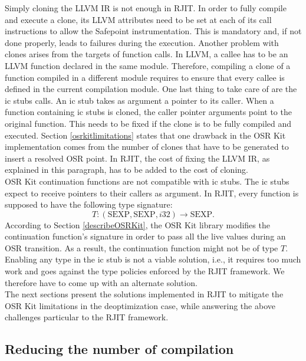 Simply cloning the LLVM IR is not enough in RJIT.
In order to fully compile and execute a clone, its LLVM attributes need to be set at each of its call instructions to allow the Safepoint instrumentation.
This is mandatory and, if not done properly, leads to failures during the execution.
Another problem with clones arises from the targets of function calls.
In LLVM, a callee has to be an LLVM function declared in the same module.
Therefore, compiling a clone of a function compiled in a different module requires to ensure that every callee is defined in the current compilation module.
One last thing to take care of are the ic stubs calls.
An ic stub takes as argument a pointer to its caller.
When a function containing ic stubs is cloned, the caller pointer arguments point to the original function.
This needs to be fixed if the clone is to be fully compiled and executed.
Section \ref{osrkitlimitations} states that one drawback in the OSR Kit implementation comes from the number of clones that have to be generated to insert a resolved OSR point.
In RJIT, the cost of fixing the LLVM IR, as explained in this paragraph, has to be added to the cost of cloning.\\

OSR Kit continuation functions are not compatible with ic stubs.
The ic stubs expect to receive pointers to their callers as argument.
In RJIT, every function is supposed to have the following type signature:
$$T: (\text{SEXP}, \text{SEXP}, i32) \rightarrow \text{SEXP}.$$
According to Section \ref{describeOSRKit}, the OSR Kit\cite{OSRKit} library modifies the continuation function's signature in order to pass all the live values during an OSR transition.
As a result, the continuation function might not be of type $T$.
Enabling any type in the ic stub is not a viable solution, i.e., it requires too much work and goes against the type policies enforced by the RJIT framework. 
We therefore have to come up with an alternate solution.\\

The next sections present the solutions implemented in RJIT to mitigate the OSR Kit limitations in the deoptimization case, while answering the above challenges particular to the RJIT framework.\\

\subsection{Reducing the number of compilation}

